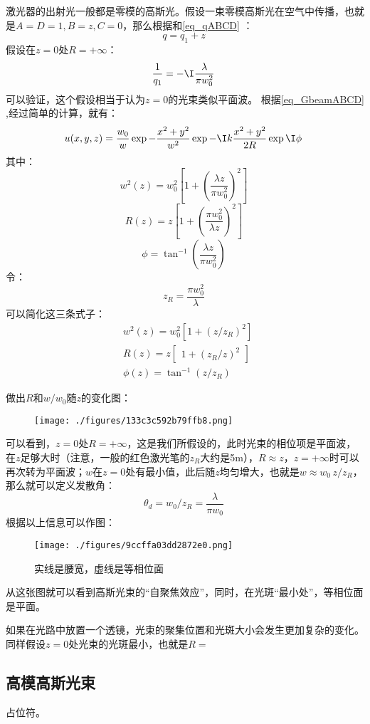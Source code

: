 激光器的出射光一般都是零模的高斯光。假设一束零模高斯光在空气中传播，也就是$A=D=1,B=z,C=0$，那么根据和\autoref{eq_qABCD} ：
\begin{equation}
q=q_1+z~
\end{equation}
假设在$z=0$处$R=+\infty$：
\begin{equation}
\frac{1}{q_1}=-\I \frac{\lambda}{\pi w_0^2}~
\end{equation}
可以验证，这个假设相当于认为$z=0$的光束类似平面波。
根据\autoref{eq_GbeamABCD} ,经过简单的计算，就有：%
\begin{equation}
u(x,y,z)=\frac{w_0}{w}\exp-\frac{x^2+y^2}{w^2}\exp-\I k\frac{x^2+y^2}{2R}\exp \I\phi ~
\end{equation}
其中：
\begin{equation}
w^2(z)=w_0^2\left[1+\left(\frac{\lambda z}{\pi w_0^2}\right)^2\right]~
\end{equation}
\begin{equation}
R(z)=z\left[1+\left(\frac{\pi w_0^2}{\lambda z}\right)^2\right]~
\end{equation}
\begin{equation}
\phi=\tan^{-1}\left(\frac{\lambda z}{\pi w_0^2}\right)~
\end{equation}
令：
\begin{equation}
z_R=\frac{\pi w_0^2}{\lambda}~
\end{equation}
可以简化这三条式子：
\begin{equation}
\begin{aligned}
&w^{2}(z) =w_{0}^{2}\left[1+(z/z_{R})^{2}\right] \\
&R(z) =z\begin{bmatrix}1+(z_R/z)^2\end{bmatrix} \\
&\phi(z) =\tan^{-1} (z/z_{R}) ~
\end{aligned}~
\end{equation}

做出$R$和$w/w_0$随$z$的变化图：
\begin{figure}[ht]
\centering
\texttt{[image: ./figures/133c3c592b79ffb8.png]}
\caption{} \label{fig_GBeam_12}
\end{figure}

可以看到，$z=0$处$R=+\infty$，这是我们所假设的，此时光束的相位项是平面波，在$z$足够大时（注意，一般的红色激光笔的$z_R$大约是5m），$R\approx z$，$z=+\infty$时可以再次转为平面波；$w$在$z=0$处有最小值，此后随$z$均匀增大，也就是$w\approx w_0 \,z/z_R$，那么就可以定义发散角：
\begin{equation}
\theta_d=w_0/z_R=\frac{\lambda}{\pi w_0}~
\end{equation}
根据以上信息可以作图：
\begin{figure}[ht]
\centering
\texttt{[image: ./figures/9ccffa03dd2872e0.png]}
\caption{实线是腰宽，虚线是等相位面} \label{fig_GBeam_13}
\end{figure}
从这张图就可以看到高斯光束的“自聚焦效应”，同时，在光斑“最小处”，等相位面是平面。

如果在光路中放置一个透镜，光束的聚集位置和光斑大小会发生更加复杂的变化。同样假设$z=0$处光束的光斑最小，也就是$R=$

\subsection{高模高斯光束}
占位符。